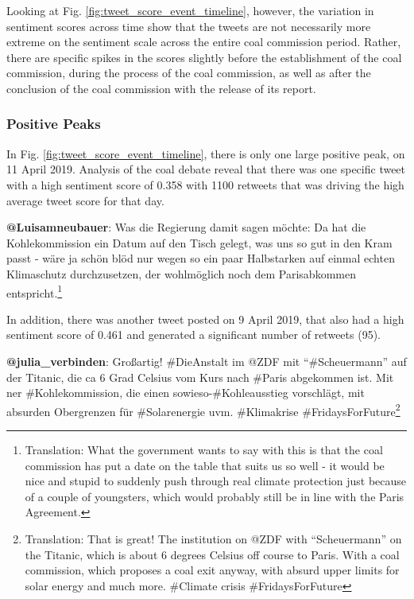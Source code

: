 \documentclass[12pt,onecolumn,twoside]{layout}
\begin{document}
Looking at Fig. \ref{fig:tweet_score_event_timeline}, however, the variation in sentiment scores across time show that the tweets are not necessarily more extreme on the sentiment scale across the entire coal commission period. Rather, there are specific spikes in the scores slightly before the establishment of the coal commission, during the process of the coal commission, as well as after the conclusion of the coal commission with the release of its report. 

\subsubsection*{Positive Peaks} 
In Fig. \ref{fig:tweet_score_event_timeline}, there is only one large positive peak, on 11 April 2019. Analysis of the coal debate reveal that there was one specific tweet with a high sentiment score of 0.358 with 1100 retweets that was driving the high average tweet score for that day.  

\begin{displayquote}
	\textbf{@Luisamneubauer}: Was die Regierung damit sagen möchte: Da hat die Kohlekommission ein Datum auf den Tisch gelegt, was uns so gut in den Kram passt - wäre ja schön blöd nur wegen so ein paar Halbstarken auf einmal echten Klimaschutz durchzusetzen, der wohlmöglich noch dem Parisabkommen entspricht.\footnote{Translation: What the government wants to say with this is that the coal commission has put a date on the table that suits us so well - it would be nice and stupid to suddenly push through real climate protection just because of a couple of youngsters, which would probably still be in line with the Paris Agreement.}
\end{displayquote}

In addition, there was another tweet posted on 9 April 2019, that also had a high sentiment score of 0.461 and generated a significant number of retweets (95). 

\begin{displayquote}
	\textbf{@julia\_verbinden}: Großartig! \#DieAnstalt im @ZDF mit ``\#Scheuermann'' auf der Titanic, die ca 6 Grad Celsius vom Kurs nach \#Paris abgekommen ist. Mit ner \#Kohlekommission, die einen sowieso-\#Kohleausstieg vorschlägt, mit absurden Obergrenzen für \#Solarenergie uvm. \#Klimakrise \#FridaysForFuture\footnote{Translation: That is great! The institution on @ZDF with ``Scheuermann'' on the Titanic, which is about 6 degrees Celsius off course to Paris. With a coal commission, which proposes a coal exit anyway, with absurd upper limits for solar energy and much more.  \#Climate crisis \#FridaysForFuture}
\end{displayquote}
\end{document}
